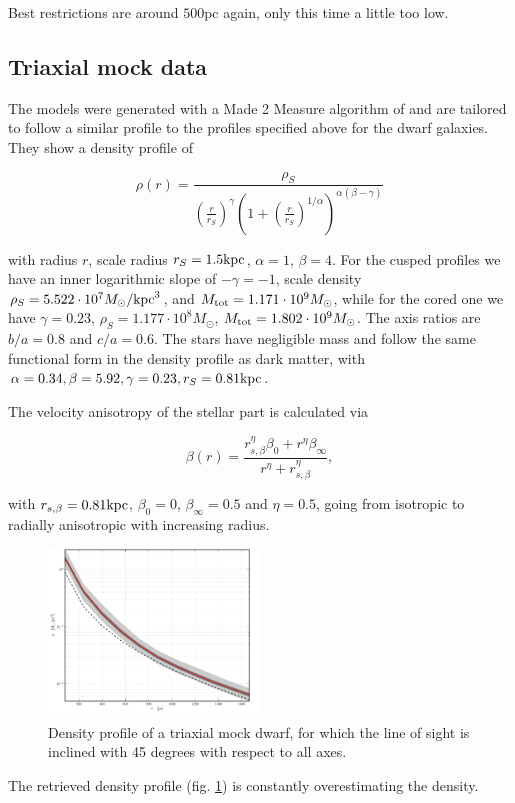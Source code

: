 Best restrictions are around $500$pc again, only this time a little
too low.





\subsection{Triaxial mock data}

The models were generated with a Made 2 Measure algorithm of \cite{Dehnen2009} and are tailored to follow a similar profile to the profiles specified above for the dwarf galaxies. They show a density profile of

\begin{equation}
\rho(r)=\frac{\rho_S}{\left(\frac{r}{r_S}\right)^\gamma\left(1+\left(\frac{r}{r_S}\right)^{1/\alpha}\right)^{\alpha(\beta-\gamma)}}
\end{equation}

with radius $r$, scale radius $r_S=1.5\mathrm{kpc}$, $\alpha=1$,
$\beta=4$. For the cusped profiles we have an inner logarithmic slope
of $-\gamma=-1$, scale density $\rho_S=5.522\cdot 10^7M_\odot/\mathrm{kpc}^3$,
and $M_{\mathrm{tot}}=1.171\cdot10^9M_\odot$, while for the cored one we have
$\gamma=0.23$, $\rho_S=1.177\cdot10^8M_\odot$,
$M_{\mathrm{tot}}=1.802\cdot10^9M_\odot$. The axis ratios are $b/a=0.8$ and
$c/a=0.6$. The stars have negligible mass and follow the same
functional form in the density profile as dark matter, with
$\alpha=0.34, \beta=5.92, \gamma=0.23, r_S=0.81\mathrm{kpc}$.

The velocity anisotropy of the stellar part is calculated via

\begin{equation}
\beta(r)=\frac{r_{s,\beta}^\eta \beta_0+r^\eta \beta_\infty}{r^\eta+r_{s,\beta}^\eta},
\end{equation}

with $r_{s,\beta}=0.81\mathrm{kpc}$, $\beta_0=0$, $\beta_\infty=0.5$ and
$\eta=0.5$, going from isotropic to radially anisotropic with
increasing radius.

\begin{figure}
\begin{center}
\hspace{-7mm}
\includegraphics[width=0.5\textwidth]{fig/20130718123300_cprior_nulog_denslog_mslope_rprior_profdens.pdf}
\caption{Density profile of a triaxial mock dwarf, for which the line
  of sight is inclined with 45 degrees with respect to all axes.}
\label{fig:triax}
\end{center}
\end{figure}

The retrieved density profile (fig. \ref{fig:triax}) is constantly
overestimating the density.



